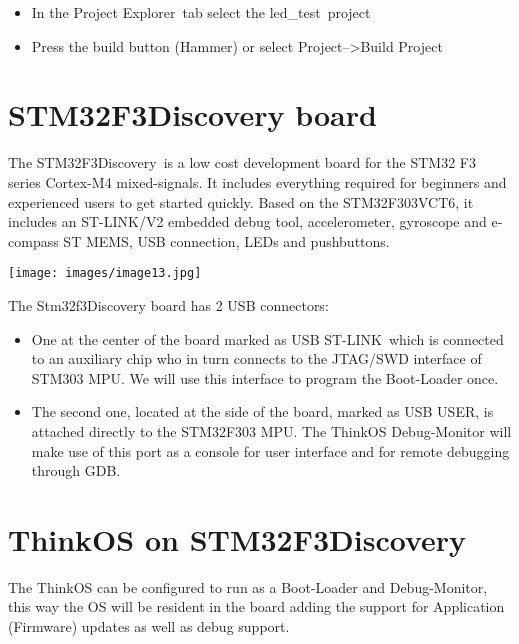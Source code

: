 \begin{itemize}
\tightlist
\item
  {In the }{Project Explorer}{~tab select the }{led\_test}{~project}
\item
  {Press the build button (Hammer) or select
  }{Project--\textgreater{}Build Project}
\end{itemize}

\hypertarget{h.35nkun2}{\section{\texorpdfstring{{STM32F3Discovery
board}}{STM32F3Discovery board}}\label{h.35nkun2}}

{The }{STM32F3Discovery}{~is a low cost development board for the STM32
F3 series Cortex-M4 mixed-signals. It includes everything required for
beginners and experienced users to get started quickly. Based on the
}{STM32F303VCT6}{, it includes an ST-LINK/V2 embedded debug tool,
accelerometer, gyroscope and e-compass ST MEMS, USB connection, LEDs and
pushbuttons.}

{\texttt{[image: images/image13.jpg]}}

{The Stm32f3Discovery board has 2 USB connectors:}

\begin{itemize}
\tightlist
\item
  {One at the center of the board marked as }{USB ST-LINK}{~which is
  connected to an auxiliary chip who in turn connects to the JTAG/SWD
  interface of STM303 MPU. We will use this interface to program the
  Boot-Loader once.}
\item
  {The second one, located at the side of the board, marked as }{USB
  USER}{, is attached directly to the STM32F303 MPU. The ThinkOS
  Debug-Monitor will make use of this port as a console for user
  interface and for remote debugging through GDB.}
\end{itemize}

\hypertarget{h.1ksv4uv}{\section{\texorpdfstring{{ThinkOS on
STM32F3Discovery}}{ThinkOS on STM32F3Discovery}}\label{h.1ksv4uv}}

{The ThinkOS can be configured to run as a Boot-Loader and
Debug-Monitor, this way the OS will be resident in the board adding the
support for Application (Firmware) updates as well as debug support.}

